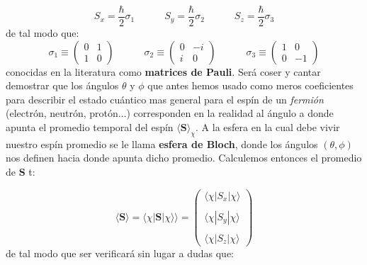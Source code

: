 \documentclass[12pt,a4paper]{article}
\numberwithin{equation}{section}
\numberwithin{figure}{section}
\newcommand{\tquad}{\quad \quad \quad}
\newcommand{\Sn}{\mathbf{S}}
\begin{document}
\begin{equation}
S_x =  \dfrac{\hbar}{2} \sigma_1 \tquad S_y = \dfrac{\hbar}{2} \sigma_2 \tquad S_z =\dfrac{\hbar}{2} \sigma_3
\end{equation}
de tal modo que:
\begin{equation}
\sigma_1 \equiv \begin{pmatrix}
0 & 1 \\
1 & 0 
\end{pmatrix}
\tquad 
\sigma_2 \equiv \begin{pmatrix}
0 & -i \\
i & 0 
\end{pmatrix} \tquad
\sigma_3 \equiv \begin{pmatrix}
1 &  0  \\
0 & -1 
\end{pmatrix}
\end{equation}
conocidas en la literatura como \textbf{matrices de Pauli}. Será coser y cantar demostrar que los ángulos $\theta$ y $\phi$ que antes hemos usado como meros coeficientes para describir el estado cuántico mas general para el espín de un \textit{fermión} (electrón, neutrón, protón...) corresponden en la realidad al ángulo a donde apunta el promedio temporal del espín $\langle \Sn \rangle_{\chi}$. A la esfera en la cual debe vivir nuestro espín promedio se le llama \textbf{esfera de Bloch}, donde los ángulos $(\theta,\phi)$ nos definen hacia donde apunta dicho promedio. Calculemos entonces el promedio de $\Sn$ t:

\begin{equation}
\langle \Sn \rangle = \langle \chi | \Sn | \chi \rangle \rangle = \begin{pmatrix}
\langle \chi | S_x | \chi \rangle \\ \\
\langle \chi | S_y | \chi \rangle \\ \\
\langle \chi | S_z | \chi \rangle 
\end{pmatrix}
\end{equation}
de tal modo que ser verificará sin lugar a dudas que:
\end{document}
